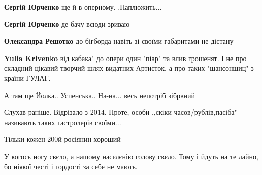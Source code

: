 \begin{itemize}
\begin{itemize}
\textbf{Сергій Юрченко} ще й в оперному. .Паплюжить...

 
\textbf{Сергій Юрченко} де бачу всюди зриваю

 
\textbf{Олександра Решотко} до бігборда навіть зі своїми габаритами не дістану 🤷🏻‍♂️😄

 
\textbf{Yulia Krivenko} від кабака" до опери один "піар" та влив грошенят.
І не про складний цікавий творчий шлях видатних Артисток, а про таких "шансонщиц" з країни ГУЛАГ.
\end{itemize}

 
А там ще Йолка.. Успенська.. На-на... весь непотріб зібрвний

 
Слухав раніше. Відрізало з 2014. Проте, особи ,,скіки часов/рублів,пасіба" -
називають таких гастролерів своїми...

 
Тільки кожен 200й росіянин хороший

 
У когось ногу свєло, а нашому насєлєнію голову свєло. Тому і йдуть на те лайно, бо ніякої честі і гордості за себе не мають.


\end{itemize}

